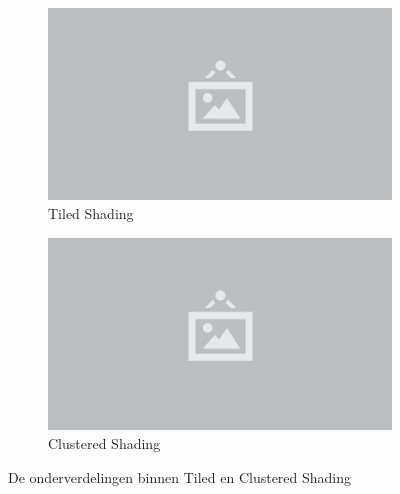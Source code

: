\begin{figure}
  \centering
  \begin{subfigure}[b]{.45\textwidth}
    \includegraphics[width=\textwidth]{./img/raw/placeholder.png}
    \caption{Tiled Shading}
    \label{fig:hs-tiled-clustered-subd-tiled}
  \end{subfigure} %
  \begin{subfigure}[b]{.45\textwidth}
    \includegraphics[width=\textwidth]{./img/raw/placeholder.png}
    \caption{Clustered Shading}
    \label{fig:hs-tiled-clustered-subd-clustered}
  \end{subfigure}
  \caption{De onderverdelingen binnen Tiled en Clustered Shading}
  \label{fig:hs-tiled-clustered-subd}
\end{figure}
